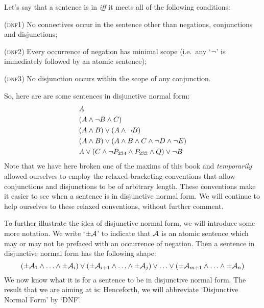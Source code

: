 Let's say that a sentence is in  \emph{iff} it meets all of the following conditions:
	\begin{earg}
		\item[(\textsc{dnf1})] No connectives occur in the sentence other than negations, conjunctions and disjunctions;
		\item[(\textsc{dnf2})] Every occurrence of negation has minimal scope (i.e.\ any `$\neg$' is immediately followed by an atomic sentence);
		\item[(\textsc{dnf3})] No disjunction occurs within the scope of any conjunction.
	\end{earg}
So, here are are some sentences in disjunctive normal form:
\begin{align*}
  & A \\
  & (A \wedge \lnot B \wedge C)\\
  & (A \wedge B) \vee (A \wedge \neg B)\\
  & (A \wedge B) \vee (A \wedge  B \wedge C \wedge \neg D \wedge \neg E)\\
  & A \vee (C \wedge \neg P_{234} \wedge P_{233} \wedge Q) \vee \neg B
\end{align*}
Note that we have here broken one of the maxims of this book and \emph{temporarily} allowed ourselves to employ the relaxed bracketing-conventions that allow conjunctions and disjunctions to be of arbitrary length. These conventions make it easier to see when a sentence is in disjunctive normal form. We will continue to help ourselves to these relaxed conventions, without further comment.

To further illustrate the idea of disjunctive normal form, we will introduce some more notation. We write `$\pm\mathcal{A}$' to indicate that $\mathcal{A}$ is an atomic sentence which may or may not be prefaced with an occurrence of negation. Then a sentence in disjunctive normal form has the following shape:
	$$(\pm \mathcal{A}_1 \land \ldots \land \pm \mathcal{A}_i) \lor (\pm \mathcal{A}_{i+1} \land \ldots \land \pm\mathcal{A}_j) \lor \ldots \lor (\pm\mathcal{A}_{m+1} \land \ldots \land \pm \mathcal{A}_n)$$
We now know what it is for a sentence to be in disjunctive normal form. The result that we are aiming at is:
Henceforth, we will abbreviate `Disjunctive Normal Form' by `DNF'.


